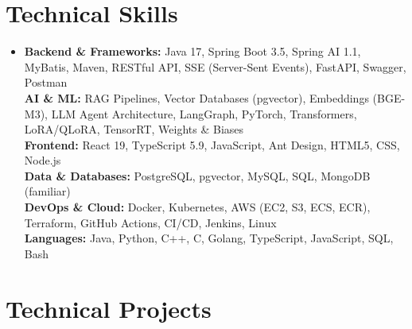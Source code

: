 \documentclass[letterpaper,11pt]{article}
\begin{document}
\section{Technical Skills}
\begin{itemize}[leftmargin=0.15in, label={}]
    \item{
        \textbf{Backend \& Frameworks:} Java 17, Spring Boot 3.5, Spring AI 1.1, MyBatis, Maven, RESTful API, SSE (Server-Sent Events), FastAPI, Swagger, Postman \\
        \textbf{AI \& ML:} RAG Pipelines, Vector Databases (pgvector), Embeddings (BGE-M3), LLM Agent Architecture, LangGraph, PyTorch, Transformers, LoRA/QLoRA, TensorRT, Weights \& Biases \\
        \textbf{Frontend:} React 19, TypeScript 5.9, JavaScript, Ant Design, HTML5, CSS, Node.js \\
        \textbf{Data \& Databases:} PostgreSQL, pgvector, MySQL, SQL, MongoDB (familiar) \\
        \textbf{DevOps \& Cloud:} Docker, Kubernetes, AWS (EC2, S3, ECS, ECR), Terraform, GitHub Actions, CI/CD, Jenkins, Linux \\
        \textbf{Languages:} Java, Python, C++, C, Golang, TypeScript, JavaScript, SQL, Bash
    }
\end{itemize}

\section{Technical Projects}
\end{document}
